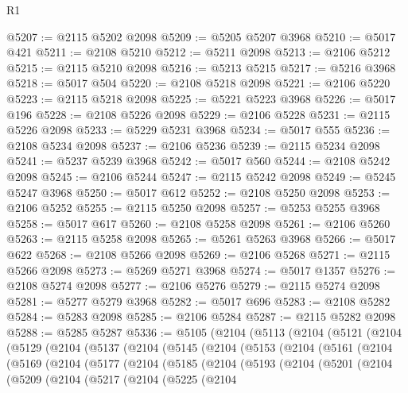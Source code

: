 \begin{lexlean}{R1}
\begin{coremodule}
@5207 := @2115 @5202 @2098
@5209 := @5205 @5207 @3968
@5210 := @5017 @421
@5211 := @2108 @5210
@5212 := @5211 @2098
@5213 := @2106 @5212
@5215 := @2115 @5210 @2098
@5216 := @5213 @5215
@5217 := @5216 @3968
@5218 := @5017 @504
@5220 := @2108 @5218 @2098
@5221 := @2106 @5220
@5223 := @2115 @5218 @2098
@5225 := @5221 @5223 @3968
@5226 := @5017 @196
@5228 := @2108 @5226 @2098
@5229 := @2106 @5228
@5231 := @2115 @5226 @2098
@5233 := @5229 @5231 @3968
@5234 := @5017 @555
@5236 := @2108 @5234 @2098
@5237 := @2106 @5236
@5239 := @2115 @5234 @2098
@5241 := @5237 @5239 @3968
@5242 := @5017 @560
@5244 := @2108 @5242 @2098
@5245 := @2106 @5244
@5247 := @2115 @5242 @2098
@5249 := @5245 @5247 @3968
@5250 := @5017 @612
@5252 := @2108 @5250 @2098
@5253 := @2106 @5252
@5255 := @2115 @5250 @2098
@5257 := @5253 @5255 @3968
@5258 := @5017 @617
@5260 := @2108 @5258 @2098
@5261 := @2106 @5260
@5263 := @2115 @5258 @2098
@5265 := @5261 @5263 @3968
@5266 := @5017 @622
@5268 := @2108 @5266 @2098
@5269 := @2106 @5268
@5271 := @2115 @5266 @2098
@5273 := @5269 @5271 @3968
@5274 := @5017 @1357
@5276 := @2108 @5274 @2098
@5277 := @2106 @5276
@5279 := @2115 @5274 @2098
@5281 := @5277 @5279 @3968
@5282 := @5017 @696
@5283 := @2108 @5282
@5284 := @5283 @2098
@5285 := @2106 @5284
@5287 := @2115 @5282 @2098
@5288 := @5285 @5287
@5336 := @5105
    (@2104
      (@5113
        (@2104
          (@5121
            (@2104
              (@5129
                (@2104
                  (@5137
                    (@2104
                      (@5145
                        (@2104
                          (@5153
                            (@2104
                              (@5161
                                (@2104
                                  (@5169
                                    (@2104
                                      (@5177
                                        (@2104
                                          (@5185
                                            (@2104
                                              (@5193
                                                (@2104
                                                  (@5201
                                                    (@2104
                                                      (@5209
                                                        (@2104
                                                          (@5217
                                                            (@2104
                                                              (@5225
                                                                (@2104

\end{coremodule}
\end{lexlean}
